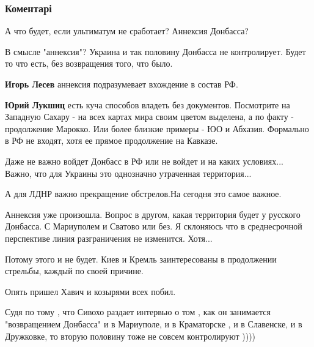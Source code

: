  
 
 
 
 
\subsubsection{Коментарі}

\begin{itemize} %
А что будет, если ультиматум не сработает? Аннексия Донбасса?

\begin{itemize} %
В смысле "аннексия"? Украина и так половину Донбасса не контролирует. Будет то что есть, без возвращения того, что было.

\textbf{Игорь Лесев} аннексия подразумевает вхождение в состав РФ.

\textbf{Юрий Лукшиц} есть куча способов владеть без документов. Посмотрите на Западную Сахару - на всех картах мира своим цветом выделена, а по факту - продолжение Марокко. Или более близкие примеры - ЮО и Абхазия. Формально в РФ не входят, хотя ее прямое продолжение на Кавказе.

Даже не важно войдет Донбасс в РФ или не войдет и на каких условиях...
Важно, что для Украины это однозначно утраченная территория...

А для ЛДНР важно прекращение обстрелов.На сегодня это самое важное.

Аннексия уже произошла.
Вопрос в другом, какая территория будет у русского Донбасса. С Мариуполем и Сватово или без.
Я склоняюсь что в среднесрочной перспективе линия разграничения не изменится. Хотя...

Потому этого и не будет. Киев и Кремль заинтересованы в продолжении стрельбы, каждый по своей причине.

Опять пришел Хавич и козырями всех побил.
\end{itemize} %


Судя по тому , что Сивохо раздает интервью о том , как он занимается
"возвращением Донбасса" и в Мариуполе, и в Краматорске , и в Славенске, и в
Дружковке, то вторую половину тоже не совсем контролируют ))))


\end{itemize}
